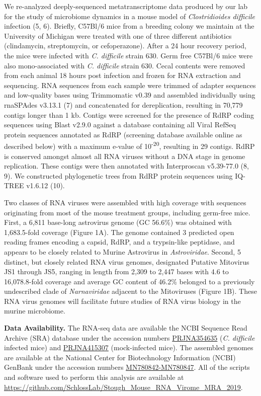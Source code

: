 \documentclass[
  11pt,
]{article}
\begin{document}
We re-analyzed deeply-sequenced metatranscriptome data produced by our
lab for the study of microbiome dynamics in a mouse model of
\emph{Clostridioides difficile} infection (5, 6). Briefly, C57Bl/6 mice
from a breeding colony we maintain at the University of Michigan were
treated with one of three different antibiotics (clindamycin,
streptomycin, or cefoperazone). After a 24 hour recovery period, the
mice were infected with \emph{C. difficile} strain 630. Germ free
C57Bl/6 mice were also mono-associated with \emph{C. difficile} strain
630. Cecal contents were removed from each animal 18 hours post
infection and frozen for RNA extraction and sequencing. RNA sequences
from each sample were trimmed of adapter sequences and low-quality bases
using Trimmomatic v0.39 and assembled individually using rnaSPAdes
v3.13.1 (7) and concatenated for dereplication, resulting in 70,779
contigs longer than 1 kb. Contigs were screened for the presence of RdRP
coding sequences using Blast v2.9.0 against a database containing all
Viral RefSeq protein sequences annotated as RdRP (screening database
available online as described below) with a maximum e-value of
10\textsuperscript{-20}, resulting in 29 contigs. RdRP is conserved
amongst almost all RNA viruses without a DNA stage in genome
replication. These contigs were then annotated with Interproscan
v5.39-77.0 (8, 9). We constructed phylogenetic trees from RdRP protein
sequences using IQ-TREE v1.6.12 (10).

Two classes of RNA viruses were assembled with high coverage with
sequences originating from most of the mouse treatment groups, including
germ-free mice. First, a 6,811 base-long astrovirus genome (GC 56.6\%)
was obtained with 1,683.5-fold coverage (Figure 1A). The genome
contained 3 predicted open reading frames encoding a capsid, RdRP, and a
trypsin-like peptidase, and appears to be closely related to Murine
Astrovirus in \emph{Astroviridae}. Second, 5 distinct, but closely
related RNA virus genomes, designated Putative Mitovirus JS1 through
JS5, ranging in length from 2,309 to 2,447 bases with 4.6 to
16,078.8-fold coverage and average GC content of 46.2\% belonged to a
previously undescribed clade of \emph{Narnaviridae} adjacent to the
Mitoviruses (Figure 1B). These RNA virus genomes will facilitate future
studies of RNA virus biology in the murine microbiome.

\textbf{Data Availability.} The RNA-seq data are available the NCBI
Sequence Read Archive (SRA) database under the accession numbers
\href{https://www.ncbi.nlm.nih.gov/bioproject/354635}{PRJNA354635}
(\emph{C. difficile} infected mice) and
\href{https://www.ncbi.nlm.nih.gov/bioproject/415307}{PRJNA415307}
(mock-infected mice). The assembled genomes are available at the
National Center for Biotechnology Information (NCBI) GenBank under the
accession numbers
\href{https://www.ncbi.nlm.nih.gov/nuccore/?term=MN780842+MN780843+MN780844+MN780845+MN780846+MN780847}{MN780842-MN780847}.
All of the scripts and software used to perform this analysis are
available at
\url{https://github.com/SchlossLab/Stough_Mouse_RNA_Virome_MRA_2019}.
\end{document}
